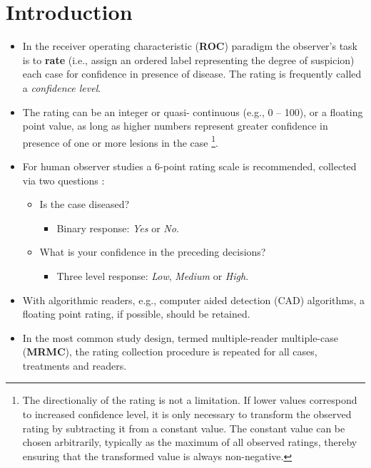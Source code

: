 \documentclass[]{book}
\providecommand{\tightlist}{%
  \setlength{\itemsep}{0pt}\setlength{\parskip}{0pt}}
\let\rmarkdownfootnote\footnote%
\def\footnote{\protect\rmarkdownfootnote}
\begin{document}
\hypertarget{introduction}{%
\section{Introduction}\label{introduction}}

\begin{itemize}
\tightlist
\item
  In the receiver operating characteristic (\textbf{ROC}) paradigm \citep{RN1766} the observer's task is to \textbf{rate} (i.e., assign an ordered label representing the degree of suspicion) each case for confidence in presence of disease. The rating is frequently called a \emph{confidence level}.
\item
  The rating can be an integer or quasi- continuous (e.g., 0 -- 100), or a floating point value, as long as higher numbers represent greater confidence in presence of one or more lesions in the case \footnote{The directionaliy of the rating is not a limitation. If lower values correspond to increased confidence level, it is only necessary to transform the observed rating by subtracting it from a constant value. The constant value can be chosen arbitrarily, typically as the maximum of all observed ratings, thereby ensuring that the transformed value is always non-negative.}.
\item
  For human observer studies a 6-point rating scale is recommended, collected via two questions \citep{RN2680}:

  \begin{itemize}
  \tightlist
  \item
    Is the case diseased?

    \begin{itemize}
    \tightlist
    \item
      Binary response: \emph{Yes} or \emph{No}.
    \end{itemize}
  \item
    What is your confidence in the preceding decisions?

    \begin{itemize}
    \tightlist
    \item
      Three level response: \emph{Low}, \emph{Medium} or \emph{High}.
    \end{itemize}
  \end{itemize}
\item
  With algorithmic readers, e.g., computer aided detection (CAD) algorithms, a floating point rating, if possible, should be retained.
\item
  In the most common study design, termed multiple-reader multiple-case (\textbf{MRMC}), the rating collection procedure is repeated for all cases, treatments and readers.
\end{itemize}
\end{document}
